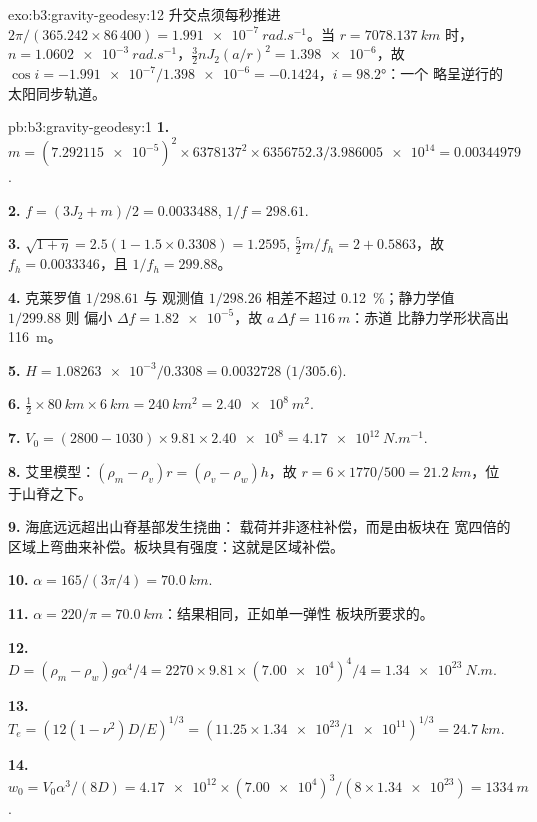 \begin{solution}{exo:b3:gravity-geodesy:12}
升交点须每秒推进 $2\pi/(365.242\times86\,400) =
\qty{1.991e-7}{rad.s^{-1}}$。当 $r = \qty{7078.137}{km}$ 时，$n =
\qty{1.0602e-3}{rad.s^{-1}}$，$\tfrac32nJ_2(a/r)^2 = \num{1.398e-6}$，故
$\cos i = -\num{1.991e-7}/\num{1.398e-6} = -0.1424$，$i = \ang{98.2}$：一个
略呈逆行的太阳同步轨道。
\end{solution}

\begin{solution}{pb:b3:gravity-geodesy:1}
\textbf{1.} $m = (\num{7.292115e-5})^2\times6378137^2\times6356752.3/
\num{3.986005e14} = \num{0.00344979}$.

\textbf{2.} $f = (3J_2 + m)/2 = \num{0.0033488}$, $1/f = 298.61$.

\textbf{3.} $\sqrt{1 + \eta} = 2.5(1 - 1.5\times0.3308) = 1.2595$,
$\tfrac52m/f_h = 2 + 0.5863$，故 $f_h = \num{0.0033346}$，且 $1/f_h = 299.88$。

\textbf{4.} 克莱罗值 $1/298.61$ 与
观测值 $1/298.26$ 相差不超过 \qty{0.12}{\percent}；静力学值 $1/299.88$ 则
偏小 $\Delta f = \num{1.82e-5}$，故 $a\,\Delta f = \qty{116}{m}$：赤道
比静力学形状高出 \qty{116}{m}。

\textbf{5.} $H = \num{1.08263e-3}/0.3308 = \num{0.0032728}$ ($1/305.6$).

\textbf{6.} $\tfrac12\times\qty{80}{km}\times\qty{6}{km} = \qty{240}{km^2} =
\qty{2.40e8}{m^2}$.

\textbf{7.} $V_0 = (2800 - 1030)\times9.81\times\num{2.40e8} =
\qty{4.17e12}{N.m^{-1}}$.

\textbf{8.} 艾里模型：$(\rho_m - \rho_v)r = (\rho_v - \rho_w)h$，故 $r =
6\times1770/500 = \qty{21.2}{km}$，位于山脊之下。

\textbf{9.} 海底远远超出山脊基部发生挠曲：
载荷并非逐柱补偿，而是由板块在
宽四倍的区域上弯曲来补偿。板块具有强度：这就是区域补偿。

\textbf{10.} $\alpha = 165/(3\pi/4) = \qty{70.0}{km}$.

\textbf{11.} $\alpha = 220/\pi = \qty{70.0}{km}$：结果相同，正如单一弹性
板块所要求的。

\textbf{12.} $D = (\rho_m - \rho_w)g\alpha^4/4 = 2270\times9.81\times(\num{7.00e4})^4/4
= \qty{1.34e23}{N.m}$.

\textbf{13.} $T_e = (12(1 - \nu^2)D/E)^{1/3} = (11.25\times\num{1.34e23}/
\num{1e11})^{1/3} = \qty{24.7}{km}$.

\textbf{14.} $w_0 = V_0\alpha^3/(8D) = \num{4.17e12}\times(\num{7.00e4})^3/
(8\times\num{1.34e23}) = \qty{1334}{m}$.


\end{solution}
